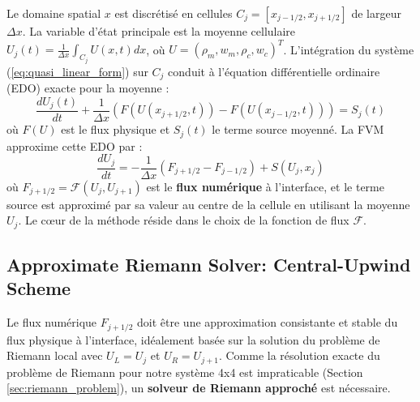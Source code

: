 Le domaine spatial \( x \) est discrétisé en cellules \( C_j = [x_{j-1/2}, x_{j+1/2}] \) de largeur \( \Delta x \). La variable d'état principale est la moyenne cellulaire \( U_j(t) = \frac{1}{\Delta x} \int_{C_j} U(x, t) dx \), où \( U = (\rho_m, w_m, \rho_c, w_c)^T \). L'intégration du système (\ref{eq:quasi_linear_form}) sur \( C_j \) conduit à l'équation différentielle ordinaire (EDO) exacte pour la moyenne :
\begin{equation}
    \label{eq:semi_discrete_fvm_exact}
    \frac{dU_j(t)}{dt} + \frac{1}{\Delta x} \left( F(U(x_{j+1/2}, t)) - F(U(x_{j-1/2}, t)) \right) = S_j(t)
\end{equation}
où \( F(U) \) est le flux physique et \( S_j(t) \) le terme source moyenné. La FVM approxime cette EDO par :
\begin{equation}
    \label{eq:semi_discrete_fvm_approx_rev}
    \frac{dU_j}{dt} = -\frac{1}{\Delta x} \left( F_{j+1/2} - F_{j-1/2} \right) + S(U_j, x_j)
\end{equation}
où \( F_{j+1/2} = \mathcal{F}(U_j, U_{j+1}) \) est le \textbf{flux numérique} à l'interface, et le terme source est approximé par sa valeur au centre de la cellule en utilisant la moyenne \( U_j \). Le cœur de la méthode réside dans le choix de la fonction de flux \( \mathcal{F} \).

\subsection{Approximate Riemann Solver: Central-Upwind Scheme}
\label{subsec:riemann_solver}

Le flux numérique \( F_{j+1/2} \) doit être une approximation consistante et stable du flux physique à l'interface, idéalement basée sur la solution du problème de Riemann local avec \( U_L = U_j \) et \( U_R = U_{j+1} \). Comme la résolution exacte du problème de Riemann pour notre système 4x4 est impraticable (Section \ref{sec:riemann_problem}), un \textbf{solveur de Riemann approché} est nécessaire.

